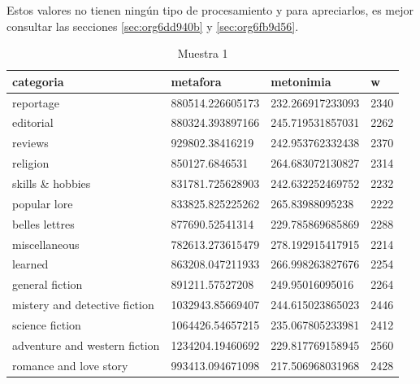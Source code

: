 \documentclass[12pt,letterpaper,twoside]{article}
\begin{document}
Estos valores no tienen ningún tipo de procesamiento y para apreciarlos, es mejor
consultar las secciones \ref{sec:org6dd940b} y \ref{sec:org6fb9d56}.
\begin{center}
    \begin{longtable}{| p{} | p{} | p{}|p{}|}
    \caption{Muestra 1}
    \hline
        categoria & metafora & metonimia & w \\ \hline
        reportage & 880514.226605173 & 232.266917233093 & 2340 \\ \hline
        editorial & 880324.393897166 & 245.719531857031 & 2262 \\ \hline
        reviews & 929802.38416219 & 242.953762332438 & 2370 \\ \hline
        religion & 850127.6846531 & 264.683072130827 & 2314 \\ \hline
        skills \& hobbies & 831781.725628903 & 242.632252469752 & 2232 \\ \hline
        popular lore & 833825.825225262 & 265.83988095238 & 2222 \\ \hline
        belles lettres & 877690.52541314 & 229.785869685869 & 2288 \\ \hline
        miscellaneous & 782613.273615479 & 278.192915417915 & 2214 \\ \hline
        learned & 863208.047211933 & 266.998263827676 & 2254 \\ \hline
        general fiction & 891211.57527208 & 249.95016095016 & 2264 \\ \hline
        mistery and detective fiction & 1032943.85669407 & 244.615023865023 & 2446 \\ \hline
        science fiction & 1064426.54657215 & 235.067805233981 & 2412 \\ \hline
        adventure and western fiction & 1234204.19460692 & 229.817769158945 & 2560 \\ \hline
        romance and love story & 993413.094671098 & 217.506968031968 & 2428 \\ \hline
\end{longtable}
\label{muestra1}
\end{center}
\end{document}
